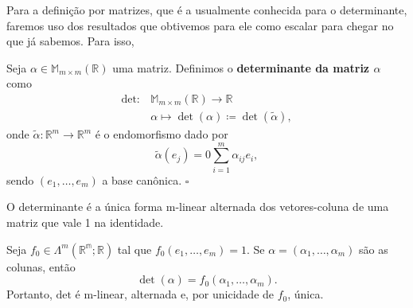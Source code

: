 \documentclass[../differential_forms.tex]{subfiles}
\begin{document}
Para a definição por matrizes, que é a usualmente conhecida para o determinante, faremos uso dos resultados que obtivemos para ele como escalar para chegar no que já sabemos. Para isso,
\begin{def*}
	Seja \(\alpha \in \mathbb{M}_{m\times m}(\mathbb{R})\) uma matriz. Definimos o \textbf{determinante da matriz \(\alpha \)} como
	\begin{align*}
		\mathrm{det}: & \mathbb{M}_{m\times m}(\mathbb{R})\rightarrow \mathbb{R}             \\
		              & \alpha \longmapsto \det{(\alpha )}\coloneqq \det{(\tilde{\alpha })},
	\end{align*}
	onde \(\tilde{\alpha }:\mathbb{R}^{m}\rightarrow \mathbb{R}^{m}\) é o endomorfismo dado por
	\[
		\tilde{\alpha }(e_{j}) =0\sum\limits_{i=1}^{m}\alpha_{ij}e_{i},
	\]
	sendo \((e_1, \dotsc , e_{m})\) a base canônica. \(\square\)
\end{def*}
\begin{prop*}
	O determinante é a única forma m-linear alternada dos vetores-coluna de uma matriz que vale 1 na identidade.
\end{prop*}

\begin{proof*}
	Seja \(f_{0}\in \Lambda^{m}(\mathbb{R^{m}}; \mathbb{R})\) tal que \(f_{0}(e_1,\dotsc , e_{m})=1\). Se \(\alpha =(\alpha_1,\dotsc , \alpha_{m})\) são as colunas, então
	\[
		\det{(\alpha )} = f_{0}(\alpha_1,\dotsc , \alpha_{m}).
	\]
	Portanto, \(\mathrm{det}\) é m-linear, alternada e, por unicidade de \(f_{0}\), única. \qedsymbol
\end{proof*}
\end{document}
